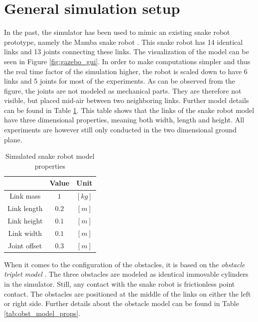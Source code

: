 \section{General simulation setup}\label{sec:simsetup}

In the past, the simulator has been used to mimic an existing snake robot prototype, namely the Mamba snake robot \cite{liljeback2014mamba}. This snake robot has 14 identical links and 13 joints connecting these links. The visualization of the model can be seen in Figure \ref{fig:gazebo_gui}. In order to make computations simpler and thus the real time factor of the simulation higher, the robot is scaled down to have 6 links and 5 joints for most of the experiments. As can be observed from the figure, the joints are not modeled as mechanical parts. They are therefore not visible, but placed mid-air between two neighboring links.
Further model details can be found in Table \ref{tab:snake_model_props}. This table shows that the links of the snake robot model have three dimensional properties, meaning both width, length and height. All experiments are however still only conducted in the two dimensional ground plane.

\begin{table}[h!]
    \centering
    \begin{tabular}{|c|c|c|}
        \hline
        & \textbf{Value} & \textbf{Unit}\\
        \hline \hline
        Link mass & $1$ & $[kg]$ \\
        Link length & $0.2$ & $[m]$ \\
        Link height & $0.1$ & $[m]$ \\
        Link width & $0.1$ & $[m]$ \\
        Joint offset & $0.3$ & $[m]$\\
        \hline
    \end{tabular}
    \caption{Simulated snake robot model properties}
    \label{tab:snake_model_props}
\end{table}

When it comes to the configuration of the obstacles, it is based on the \textit{obstacle triplet model} \cite{sanfilippo2018snakesim}. The three obstacles are modeled as identical immovable cylinders in the simulator. Still, any contact with the snake robot is frictionless point contact. The obstacles are positioned at the middle of the links on either the left or right side. Further details about the obstacle model can be found in Table \ref{tab:obst_model_props}.

